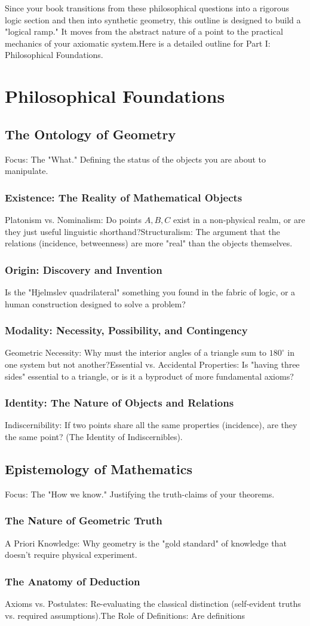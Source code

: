 \documentclass{book}
\begin{document}
Since your book transitions from these philosophical questions into a rigorous logic section and then into synthetic geometry, this outline is designed to build a "logical ramp." It moves from the abstract nature of a point to the practical mechanics of your axiomatic system.Here is a detailed outline for Part I: Philosophical Foundations.\part{Philosophical Foundations}\chapter{The Ontology of Geometry}Focus: The "What." Defining the status of the objects you are about to manipulate.\section{Existence: The Reality of Mathematical Objects}Platonism vs. Nominalism: Do points $A, B, C$ exist in a non-physical realm, or are they just useful linguistic shorthand?Structuralism: The argument that the relations (incidence, betweenness) are more "real" than the objects themselves.\section{Origin: Discovery and Invention}Is the "Hjelmslev quadrilateral" something you found in the fabric of logic, or a human construction designed to solve a problem?\section{Modality: Necessity, Possibility, and Contingency}Geometric Necessity: Why must the interior angles of a triangle sum to $180^\circ$ in one system but not another?Essential vs. Accidental Properties: Is "having three sides" essential to a triangle, or is it a byproduct of more fundamental axioms?\section{Identity: The Nature of Objects and Relations}Indiscernibility: If two points share all the same properties (incidence), are they the same point? (The Identity of Indiscernibles).\chapter{Epistemology of Mathematics}Focus: The "How we know." Justifying the truth-claims of your theorems.\section{The Nature of Geometric Truth}A Priori Knowledge: Why geometry is the "gold standard" of knowledge that doesn't require physical experiment.\section{The Anatomy of Deduction}Axioms vs. Postulates: Re-evaluating the classical distinction (self-evident truths vs. required assumptions).The Role of Definitions: Are definitions 
\end{document}
